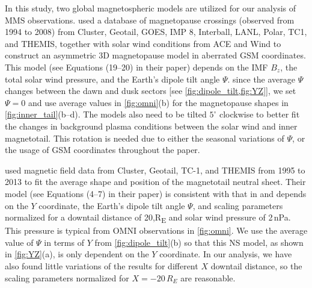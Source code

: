 \documentclass[draft]{agujournal2019}
\begin{document}
In this study, two global magnetospheric models are utilized for our analysis of MMS observations.  used a database of magnetopause crossings (observed from 1994 to 2008) from Cluster, Geotail, GOES, IMP 8, Interball, LANL, Polar, TC1, and THEMIS, together with solar wind conditions from ACE and Wind to construct an asymmetric 3D magnetopause model in aberrated GSM coordinates. This model (see Equations (19--20) in their paper) depends on the IMF $B_z$, the total solar wind pressure, and the Earth's dipole tilt angle $\Psi$. since the average $\Psi$ changes between the dawn and dusk sectors [see \cref{fig:dipole_tilt,fig:YZ}], we set $\Psi=0$ and use average values in \cref{fig:omni}(b) for the magnetopause shapes in \cref{fig:inner_tail}(b--d). The models also need to be tilted $5^\circ$ clockwise to better fit the changes in background plasma conditions between the solar wind and inner magnetotail. This rotation is needed due to either the seasonal variations of $\Psi$, or the usage of GSM coordinates throughout the paper.

 used magnetic field data from Cluster, Geotail, TC-1, and THEMIS from 1995 to 2013 to fit the average shape and position of the magnetotail neutral sheet. Their model (see Equations (4--7) in their paper) is consistent with that in  and depends on the $Y$ coordinate, the Earth's dipole tilt angle $\Psi$, and scaling parameters normalized for a downtail distance of 20,\si{R_E} and solar wind pressure of 2\,\si{nPa}. This pressure is typical from OMNI observations in \cref{fig:omni}. We use the average value of $\Psi$ in terms of $Y$ from \cref{fig:dipole_tilt}(b) so that this NS model, as shown in \cref{fig:YZ}(a), is only dependent on the $Y$ coordinate. In our analysis, we have also found little variations of the results for different $X$ downtail distance, so the scaling parameters normalized for $X=-20\,\si{R_E}$ are reasonable.


\end{document}
